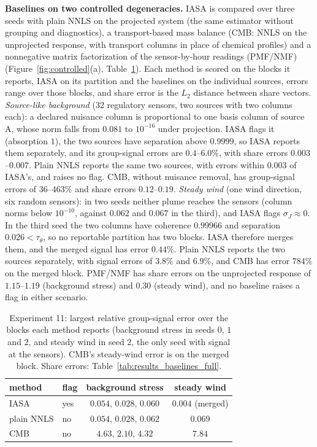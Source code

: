 \noindent\textbf{Baselines on two controlled degeneracies.}
IASA is compared over three seeds with plain NNLS on the projected system (the same
estimator without grouping and diagnostics), a transport-based mass balance (CMB: NNLS
on the unprojected response, with transport columns in place of chemical profiles) and
a nonnegative matrix factorization of the sensor-by-hour readings (PMF/NMF)
(Figure~\ref{fig:controlled}(a), Table~\ref{tab:results_baselines}).  Each method is
scored on the blocks it reports, IASA on its partition and the baselines on the
individual sources, errors range over those blocks, and share error is the \(L_2\)
distance between share vectors.  \emph{Source-like background} (32 regulatory
sensors, two sources with two columns each): a declared nuisance column is
proportional to one basis column of source A, whose norm falls from \(0.081\) to
\(10^{-16}\) under projection.  IASA flags it (absorption \(1\)), the two sources
have separation above \(0.9999\), so IASA reports them separately, and its group-signal
errors are \(0.4\)--\(6.0\%\), with share errors \(0.003\)--\(0.007\).  Plain NNLS reports
the same two sources, with errors within \(0.003\) of IASA's, and raises no flag.  CMB,
without nuisance removal, has group-signal errors of \(36\)--\(463\%\) and share errors
\(0.12\)--\(0.19\).  \emph{Steady wind}
(one wind direction, six random sensors): in two seeds neither plume reaches the
sensors (column norms below \(10^{-10}\), against \(0.062\) and \(0.067\) in the third), and
IASA flags \(\sigma_J\approx0\).  In the third seed the two columns have coherence
\(0.99966\) and separation \(0.026<\tau_\theta\), so no reportable partition has two
blocks.  IASA therefore merges them, and the merged signal has error \(0.44\%\).  Plain
NNLS reports the two sources separately, with signal errors of \(3.8\%\) and \(6.9\%\), and
CMB has error \(784\%\) on the merged block.  PMF/NMF has share errors on the unprojected response of
\(1.15\)--\(1.19\) (background stress) and \(0.30\) (steady wind), and no baseline raises
a flag in either scenario.

\begin{table}[t]
\centering
\footnotesize
\setlength{\tabcolsep}{3pt}
\caption{Experiment 11: largest relative group-signal error over the blocks each method
reports (background stress in seeds \(0\), \(1\) and \(2\), and steady wind in seed \(2\),
the only seed with signal at the sensors).  CMB's steady-wind error is on the merged
block.  Share errors: Table~\ref{tab:results_baselines_full}.}
\label{tab:results_baselines}
\vspace{3pt}
\begin{tabular}{llcc}
\toprule
method & flag & background stress & steady wind \\
\midrule
IASA & yes & \(0.054,\,0.028,\,0.060\) & \(0.004\) (merged) \\
plain NNLS & no & \(0.054,\,0.028,\,0.062\) & \(0.069\) \\
CMB & no & \(4.63,\,2.10,\,4.32\) & \(7.84\) \\
\bottomrule
\end{tabular}
\end{table}

